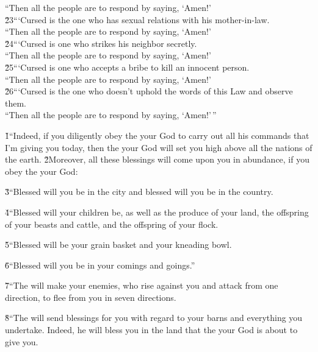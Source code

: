 \begin{poetry}
\poeml ``Then all the people are to respond by saying, `Amen!' \\
\poeml \v{23}```Cursed is the one who has sexual relations with his mother-in-law. \\
\poeml ``Then all the people are to respond by saying, `Amen!' \\
\poeml \v{24}```Cursed is one who strikes his neighbor secretly. \\
\poeml ``Then all the people are to respond by saying, `Amen!' \\
\poeml \v{25}```Cursed is one who accepts a bribe to kill an innocent person. \\
\poeml ``Then all the people are to respond by saying, `Amen!' \\
\poeml \v{26}```Cursed is the one who doesn't uphold the words of this Law and observe them. \\
\poeml ``Then all the people are to respond by saying, `Amen!'\,''
\end{poetry}

\v{1}``Indeed, if you diligently obey the  your God to carry out all his commands that I'm giving you today, then the  your God will set you high above all the nations of the earth. \v{2}Moreover, all these blessings will come upon you in abundance, if you obey the  your God:

\v{3}``Blessed will you be in the city and blessed will you be in the country.

\v{4}``Blessed will your children be, as well as the produce of your land, the offspring of your beasts and cattle, and the offspring of your flock.

\v{5}``Blessed will be your grain basket and your kneading bowl.

\v{6}``Blessed will you be in your comings and goings.''

\v{7}``The  will make your enemies, who rise against you and attack from one direction, to flee from you in seven directions.

\v{8}``The  will send blessings for you with regard to your barns and everything you undertake. Indeed, he will bless you in the land that the  your God is about to give you.

